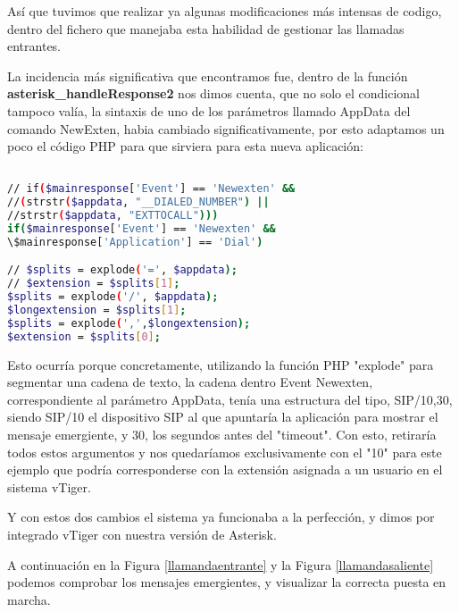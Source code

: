 {Así que tuvimos que realizar ya algunas modificaciones más intensas de codigo, dentro del fichero que manejaba esta habilidad de gestionar las llamadas entrantes.

La incidencia más significativa que encontramos fue, dentro de la función \textbf{asterisk\_handleResponse2} nos dimos cuenta, que no solo el condicional tampoco valía, la sintaxis de uno de los parámetros llamado AppData del comando NewExten, habia cambiado significativamente, por esto adaptamos un poco el código PHP para que sirviera para esta nueva aplicación:

\begin{lstlisting}[language=bash,title={./www/vtigercrm/cron/modules/PBXManager/AsteriskClient.php}]

// if($mainresponse['Event'] == 'Newexten' && 
//(strstr($appdata, "__DIALED_NUMBER") || 
//strstr($appdata, "EXTTOCALL")))
if($mainresponse['Event'] == 'Newexten' && 
\$mainresponse['Application'] == 'Dial')

// $splits = explode('=', $appdata);
// $extension = $splits[1];
$splits = explode('/', $appdata); 
$longextension = $splits[1];
$splits = explode(',',$longextension);
$extension = $splits[0];

\end{lstlisting}

Esto ocurría porque concretamente, utilizando la función PHP "explode" para segmentar una cadena de texto, la cadena dentro Event Newexten, correspondiente al parámetro AppData, tenía una estructura del tipo, SIP/10,30, siendo SIP/10 el dispositivo SIP al que apuntaría la aplicación para mostrar el mensaje emergiente, y 30, los segundos antes del "timeout". Con esto, retiraría todos estos argumentos y nos quedaríamos exclusivamente con el "10" para este ejemplo que podría corresponderse con la extensión asignada a un usuario en el sistema vTiger.

Y con estos dos cambios el sistema ya funcionaba a la perfección, y dimos por integrado vTiger con nuestra versión de Asterisk.

A continuación en la Figura \ref{llamandaentrante} y la Figura \ref{llamandasaliente} podemos comprobar los mensajes emergientes, y visualizar la correcta puesta en marcha.



}
